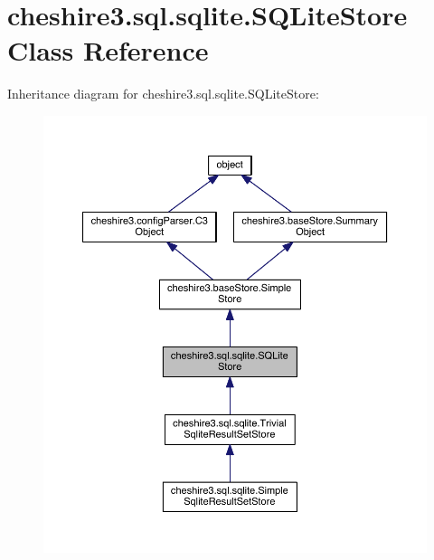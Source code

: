 \hypertarget{classcheshire3_1_1sql_1_1sqlite_1_1_s_q_lite_store}{\section{cheshire3.\-sql.\-sqlite.\-S\-Q\-Lite\-Store Class Reference}
\label{classcheshire3_1_1sql_1_1sqlite_1_1_s_q_lite_store}
}


Inheritance diagram for cheshire3.\-sql.\-sqlite.\-S\-Q\-Lite\-Store\-:
\nopagebreak
\begin{figure}[H]
\begin{center}
\leavevmode
\includegraphics[width=350pt]{classcheshire3_1_1sql_1_1sqlite_1_1_s_q_lite_store__inherit__graph}
\end{center}
\end{figure}


